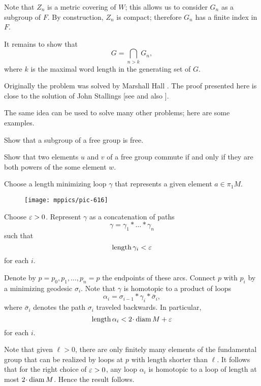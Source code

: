 Note that $Z_n$ is a metric covering of $W$;
this allows us to consider $G_n$ as a subgroup of $F$.
By construction, $Z_n$ is compact;
therefore $G_n$ has a finite index in $F$.


It remains to show that 
\[G=\bigcap_{n>k} G_n,\]
where $k$ is the maximal word length in the generating set of $G$.
\qeds

Originally the problem was solved by Marshall Hall \cite{hall}.
The proof presented here is close to the solution of John Stallings [see  and also ].

The same idea can be used to solve many other problems; here are some examples.

\begin{pr}
 Show that a subgroup of a free group is free.
\end{pr}

\begin{pr}
 Show that two elements $u$ and $v$ of a free group commute 
if and only if they are both powers of
the some element $w$.
\end{pr}




Choose a length minimizing loop $\gamma$ that represents a given element $a\in\pi_1M$.

\begin{wrapfigure}{o}{20 mm}
\vskip-0mm
\centering
\texttt{[image: mppics/pic-616]}
\end{wrapfigure}

Choose $\varepsilon>0$.
Represent $\gamma$ 
as a concatenation of paths
\[\gamma=\gamma_1{*}\dots{*}\gamma_n\]
such that
\[\operatorname{\rm length}\gamma_i<\varepsilon\] 
for each $i$.

 
Denote by $p=p_0,p_1,\dots, p_n=p$ the endpoints of these arcs.
Connect $p$ with $p_i$ by a minimizing geodesic $\sigma_i$.
Note that $\gamma$ is homotopic to a product of loops
\[\alpha_i=\sigma_{i-1}{*}\gamma_i{*}\bar\sigma_{i},\]
where $\bar\sigma_{i}$ denotes the path $\sigma_{i}$ traveled backwards.
In particular,
\[\length \alpha_i<2\cdot\diam M+\eps \]
for each $i$.

Note that given $\ell>0$, there are only finitely many elements of the fundamental group that can be realized by loops at $p$ with length shorter than $\ell$.
It follows that for the right choice of $\varepsilon>0$, 
any loop $\alpha_i$ is homotopic to a loop of length at most $2\cdot\diam M$.
Hence the result follows.
\qeds

